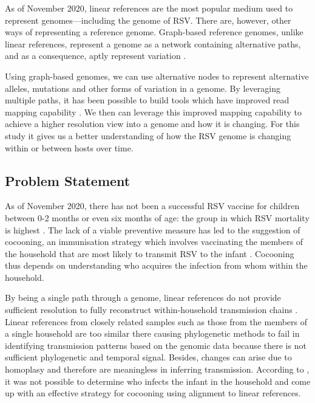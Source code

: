 \documentclass[10pt, a4paper]{article}
\begin{document}
As of November 2020, linear references are the most popular medium used to
represent genomes—including the genome of RSV. There are, however, other ways of
representing a reference genome. Graph-based reference genomes,  unlike linear
references, represent a genome as a network containing alternative paths, and as
a consequence, aptly represent variation \cite{patenGenomeGraphsEvolution2017}.

Using graph-based genomes, we can use alternative nodes to represent alternative
alleles, mutations and other forms of variation in a genome.
By leveraging multiple paths, it has been possible to build tools which have
improved read mapping capability
\cite{garrisonVariationGraphToolkit2018,eizengaSuccinctDynamicVariation2020}.
We then can leverage this improved mapping capability to achieve a higher
resolution view into a genome and how it is changing. For this study it gives us
a better understanding of how the RSV genome is changing within or between hosts
over time.

\subsection{Problem Statement}
\label{sec:orge0fb108}
As of November 2020, there has not been a successful RSV vaccine for children
between 0-2 months or even six months of age: the group in which RSV mortality
is highest \cite{nokesNewStrategiesControl2008}.
The lack of a viable preventive measure has led to the suggestion of cocooning,
an immunisation strategy which involves vaccinating the members of the household
that are most likely to transmit RSV to the infant
\cite{grizasCocooningConceptProtect2012,urwylerProtectingNewbornsPertussis2014,blainAssessmentCocooningStrategy2016}.
Cocooning thus depends on understanding who acquires the infection from whom
within the household.

By being a single path through a genome, linear references do not provide
sufficient resolution to fully reconstruct within-household transmission chains
\cite{agotiGenomicAnalysisRespiratory2019,githinjiAssessingUtilityMinority2018}.
Linear references from closely related samples such as those from the members of
a single household are too similar there causing phylogenetic methods to fail in
identifying transmission patterns based on the genomic data because there is not
sufficient phylogenetic and temporal signal. Besides, changes can arise due to
homoplasy and therefore are meaningless in inferring transmission.
According to \cite{agotiGenomicAnalysisRespiratory2019}, it was not possible to
determine who infects the infant in the household and come up with an effective
strategy for cocooning using alignment to linear references.
\end{document}
